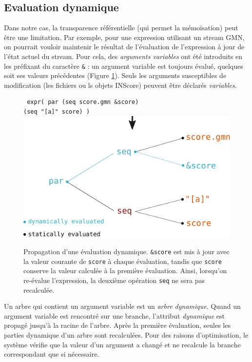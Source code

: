 \documentclass{article}
\newcommand{\OSC}[1]{\texttt{#1}}
\newcommand{\oper}[1]{\textcolor{figRed}{#1}}
\newcommand{\param}[1]{\textcolor{figOrange}{#1}}
\newcommand{\prefix}[1]{\textcolor{figBlue}{#1}}
\newcommand{\tab}{\hspace*{4mm}}
\begin{document}
\subsection{Evaluation dynamique}

Dans notre cas, la transparence référentielle (qui permet la mémoïsation) peut être une limitation. Par exemple, pour une expression utilisant un stream GMN, on pourrait vouloir maintenir le résultat de l'évaluation de l'expression à jour de l'état actuel du stream. Pour cela, des \emph{arguments variables} ont été introduits en les préfixant du caractère \OSC{\&} : un argument variable est toujours évalué, quelques soit ses valeurs précédentes (Figure \ref{fig:dynamicEval}). Seuls les arguments susceptibles de modification (les fichiers ou ls objets INScore) peuvent être déclarés \emph{variables}.

\begin{figure}[th]
\centering
\OSC{ expr( \oper{par} (\oper{seq} \param{score.gmn} \prefix{\&}\param{score}) \\
 \tab\tab\tab\tab (\oper{seq} \param{"[a]" score}) )}
\includegraphics[width=0.9\columnwidth]{imgs/dynamicEval}
\caption{Propagation d'une évaluation dynamique. \OSC{\prefix{\&}\param{score}} est mis à jour avec la valeur courante de \OSC{score} à chaque évaluation, tandis que \OSC{\param{score}} conserve la valeur calculée à la première évaluation. Ainsi, lorsqu'on re-évalue l'expression, la deuxième opération \OSC{\oper{seq}} ne sera pas recalculée. 
}
\label{fig:dynamicEval}
\end{figure}

Un arbre qui contient un argument variable est un \emph{arbre dynamique}. Quand un argument variable est rencontré sur une branche, l'attribut \emph{dynamique} est propagé jusqu'à la racine de l'arbre. Après la première évaluation, seules les parties dynamique d'un arbre sont recalculées. Pour des raisons d'optimisation, le système vérifie que la valeur d'un argument a changé et ne recalcule la branche correspondant que si nécessaire.
\end{document}
